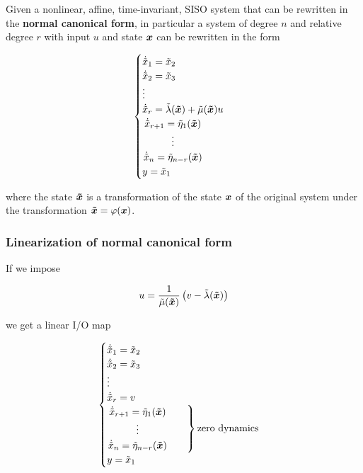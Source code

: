 Given a nonlinear, affine, time-invariant, SISO system that can be rewritten in the \textbf{normal canonical form}, in particular a system of degree $n$ and relative degree $r$ with input $u$ and state $\boldsymbol{x}$ can be rewritten in the form

\[
    \begin{cases}
        \dot{\tilde x}_1 = \tilde x_2 \\
        \dot{\tilde x}_2 = \tilde x_3 \\
        \vdots \\
        \dot{\tilde x}_r = \tilde\lambda(\boldsymbol{\tilde x}) + \tilde\mu (\boldsymbol{\tilde x}) u \\
        \left.\begin{matrix}\dot{\tilde x}_{r+1} = \tilde\eta_1(\boldsymbol{\tilde x}) \\
        \vdots \\
        \dot{\tilde x}_{n} = \tilde\eta_{n-r}(\boldsymbol{\tilde x}) \\
        \end{matrix} \qquad \right. \\
        y = \tilde x_1
    \end{cases}
\]

where the state $\boldsymbol{\tilde x}$ is a transformation of the state $\boldsymbol{x}$ of the original system under the transformation $\boldsymbol{\tilde x} = \varphi(\boldsymbol{x})$.

\subsubsection{Linearization of normal canonical form}

If we impose

\[
    u = \frac{1}{\tilde\mu (\boldsymbol{\tilde x})} \left( v - \tilde\lambda(\boldsymbol{\tilde x}) \right)
\]

we get a linear I/O map

\[
    \begin{cases}
        \dot{\tilde x}_1 = \tilde x_2 \\
        \dot{\tilde x}_2 = \tilde x_3 \\
        \vdots \\
        \dot{\tilde x}_r = v \\
        \left.\begin{matrix}\dot{\tilde x}_{r+1} = \tilde\eta_1(\boldsymbol{\tilde x}) \\
        \vdots \\
        \dot{\tilde x}_{n} = \tilde\eta_{n-r}(\boldsymbol{\tilde x}) \\
        \end{matrix} \qquad \right\} \text{zero dynamics} \\
        y = \tilde x_1
    \end{cases}
\]

